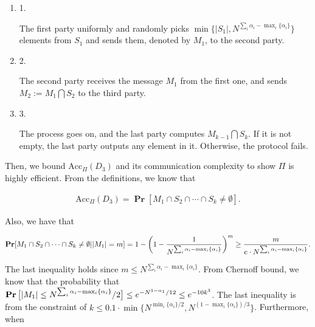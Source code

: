 \documentclass[10pt,a4paper]{article}
\begin{document}
\begin{enumerate}


\item[] 
1. 


The first party uniformly and randomly picks $\mathop{\min}\{|S_{1}|,N^{\sum_{i}\alpha_{i}-\mathop{\max}_{i}\{\alpha_{i}\}}\}$ elements from $S_{1}$ and sends them, denoted by $M_{1}$, to the second party.\par





\item[] 
2. 


The second party receives the message $M_{1}$ from the first one, and sends $M_{2}:=M_{1}\bigcap S_{2}$ to the third party.\par





\item[] 
3. 


The process goes on, and the last party computes $M_{k-1}\bigcap S_{k}$. If it is not empty, the last party outputs any element in it. Otherwise, the protocol fails.\par





\end{enumerate}


Then, we bound $\text{Acc}_{\Pi}(D_{3})$ and its communication complexity to show $\Pi$ is highly efficient. From the definitions, we know that\par


\[\begin{gathered}
\text{Acc}_{\Pi}(D_{3})=\operatorname*{\mathbf{Pr}}[M_{1}\cap S_{2}\cap\cdots\cap S_{k}\neq\emptyset].
\end{gathered}\]


Also, we have that\par


\[\begin{gathered}
\operatorname*{\mathbf{Pr}}[M_{1}\cap S_{2}\cap\cdots\cap S_{k}\neq\emptyset||M_{1}|=m]=1-\bigg{(}1-\frac{1}{N^{\sum_{i}\alpha_{i}-\mathop{\max}_{i}\{\alpha_{i}\}}}\bigg{)}^{m}\geq\frac{m}{e\cdot N^{\sum_{i}\alpha_{i}-\mathop{\max}_{i}\{\alpha_{i}\}}}.
\end{gathered}\]


The last inequality holds since $m\leq N^{\sum_{i}\alpha_{i}-\mathop{\max}_{i}\{\alpha_{i}\}}$. From Chernoff bound, we know that the probability that $\operatorname*{\mathbf{Pr}}\big{[}|M_{1}|\leq N^{\sum_{i}\alpha_{i}-\mathop{\max}_{i}\{\alpha_{i}\}}/2\big{]}\leq e^{-N^{1-\alpha_{1}}/12}\leq e^{-10k^{3}}$. The last inequality is from the constraint of $k\leq 0.1\cdot\min\{N^{\min_{i}\{\alpha_{i}\}/2},N^{(1-\max_{i}\{\alpha_{i}\})/3}\}$. Furthermore, when\par
\end{document}
